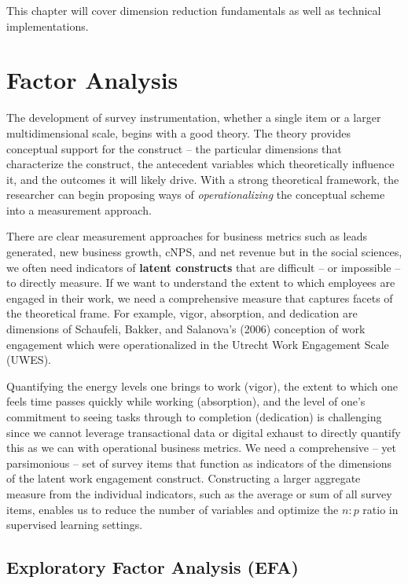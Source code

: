 \documentclass[
]{book}
\begin{document}
This chapter will cover dimension reduction fundamentals as well as technical implementations.

\hypertarget{factor-analysis}{%
\section{Factor Analysis}\label{factor-analysis}}

The development of survey instrumentation, whether a single item or a larger multidimensional scale, begins with a good theory. The theory provides conceptual support for the construct -- the particular dimensions that characterize the construct, the antecedent variables which theoretically influence it, and the outcomes it will likely drive. With a strong theoretical framework, the researcher can begin proposing ways of \emph{operationalizing} the conceptual scheme into a measurement approach.

There are clear measurement approaches for business metrics such as leads generated, new business growth, cNPS, and net revenue but in the social sciences, we often need indicators of \textbf{latent constructs} that are difficult -- or impossible -- to directly measure. If we want to understand the extent to which employees are engaged in their work, we need a comprehensive measure that captures facets of the theoretical frame. For example, vigor, absorption, and dedication are dimensions of Schaufeli, Bakker, and Salanova's (2006) conception of work engagement which were operationalized in the Utrecht Work Engagement Scale (UWES).

Quantifying the energy levels one brings to work (vigor), the extent to which one feels time passes quickly while working (absorption), and the level of one's commitment to seeing tasks through to completion (dedication) is challenging since we cannot leverage transactional data or digital exhaust to directly quantify this as we can with operational business metrics. We need a comprehensive -- yet parsimonious -- set of survey items that function as indicators of the dimensions of the latent work engagement construct. Constructing a larger aggregate measure from the individual indicators, such as the average or sum of all survey items, enables us to reduce the number of variables and optimize the \(n:p\) ratio in supervised learning settings.

\hypertarget{exploratory-factor-analysis-efa}{%
\subsection{Exploratory Factor Analysis (EFA)}\label{exploratory-factor-analysis-efa}}
\end{document}
